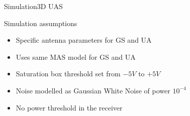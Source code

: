 
\begin{frame}{Simulation}{3D UAS}
  \begin{block}{Simulation assumptions}
	  \begin{itemize}
	  	\item Specific antenna parameters for GS and UA
	  	\item Uses same MAS model for GS and UA
	  	\item Saturation box threshold set from $-5V$ to $+5V$
	  	\item Noise modelled as Gaussian White Noise of power $10^{-4}$
	  	\item No power threshold in the receiver
	  \end{itemize}
  \end{block}
\end{frame}